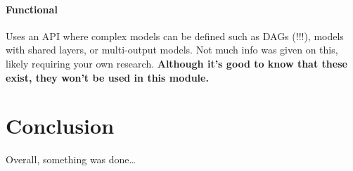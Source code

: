 \documentclass[12pt]{report}
\begin{document}
\subsubsection{Functional}
Uses an API where complex models can be defined such as DAGs (!!!), models with shared layers, 
or multi-output models. Not much info was given on this, likely requiring your own research.
\textbf{Although it's good to know that these exist, they won't be used in this module.}  


\chapter*{Conclusion}

Overall, something was done\dots
\end{document}
